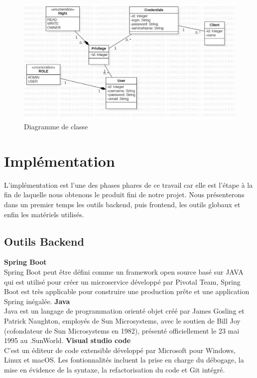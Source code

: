 \documentclass[11pt,a4paper]{report}
\begin{document}
 \begin{center}
 \begin{figure}[H]
 \includegraphics[width=\linewidth]{img/jpg/safeprivacing-diagramme-classe4.jpg}
 \caption{Diagramme de classe}
 \label{fig:diagram6}
 \end{figure}
 \end{center}
 \section{Implémentation}
 
 L'implémentation est l'une des phases phares de ce travail car elle est l'étape à la fin de
laquelle nous obtenons le produit fini de notre projet. Nous présenterons dans un premier temps
les outils backend, puis frontend, les outils globaux et enfin les matériels utilisés.

\subsection{Outils Backend}

 \textbf{Spring Boot} \\ 
Spring Boot peut être défini comme un framework open source basé sur JAVA qui est utilisé pour créer un microservice développé par Pivotal Team, Spring Boot est très applicable pour construire une production prête et une application Spring inégalée.
 \textbf{Java} \\ 
 Java est un langage de programmation orienté objet créé par James Gosling et Patrick Naughton, employés de Sun Microsystems, avec le soutien de Bill Joy (cofondateur de Sun Microsystems en 1982), présenté officiellement le 23 mai 1995 au .SunWorld.
 \textbf{Visual studio code} \\ 
  C'est un éditeur de code extensible développé par Microsoft pour Windows, Linux et
macOS. Les fontionnalités incluent la prise en charge du débogage, la mise en évidence de
la syntaxe, la refactorisation du code et Git intégré.
 
\end{document}
